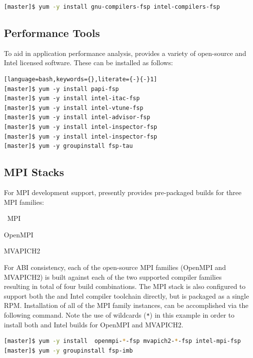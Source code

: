 \documentclass[letterpaper]{article}
\begin{document}
\begin{lstlisting}[language=bash]
[master]$ yum -y install gnu-compilers-fsp intel-compilers-fsp
\end{lstlisting}

\subsection{Performance Tools}

To aid in application performance analysis, \FSP{} provides a variety of
open-source and Intel licensed software. These can be installed as follows:

\begin{lstlisting}[language=bash,keywords={},literate={-}{-}1]
[master]$ yum -y install papi-fsp
[master]$ yum -y install intel-itac-fsp
[master]$ yum -y install intel-vtune-fsp
[master]$ yum -y install intel-advisor-fsp
[master]$ yum -y install intel-inspector-fsp
[master]$ yum -y install intel-inspector-fsp
[master]$ yum -y groupinstall fsp-tau
\end{lstlisting}

\subsection{MPI Stacks} \label{sec:mpi}

For MPI development support, \FSP{} presently provides pre-packaged builds for
three MPI families: 

\begin{itemize*}
\item \Intel{}~MPI
\item OpenMPI
\item MVAPICH2
\end{itemize*}
 For ABI consistency, each of the open-source MPI families (OpenMPI and
 MVAPICH2) is built against each of the two supported compiler families
 resulting in total of four build combinations.  The \Intel{} MPI stack is also
 configured to support both the \GNU{} and Intel compiler toolchain directly, but
 is packaged as a single RPM. Installation of all of the MPI family instances,
 can be accomplished via the following command. Note the use of wildcards
 (\texttt{*}) in this example in order to install both \GNU{} and Intel builds for
 OpenMPI and MVAPICH2.

\begin{lstlisting}[language=bash]
[master]$ yum -y install  openmpi-*-fsp mvapich2-*-fsp intel-mpi-fsp
[master]$ yum -y groupinstall fsp-imb
\end{lstlisting}
\end{document}
